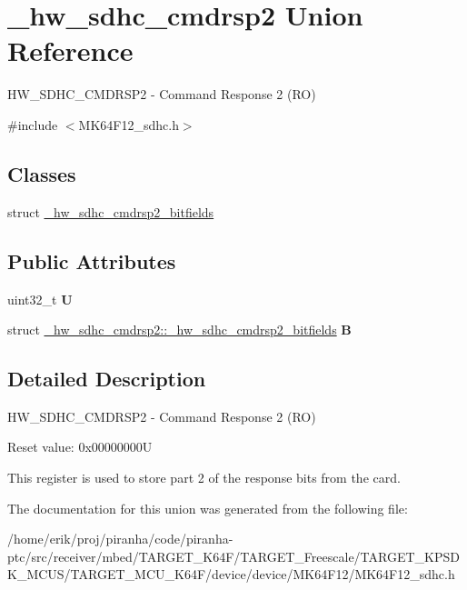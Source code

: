 \hypertarget{union__hw__sdhc__cmdrsp2}{}\section{\+\_\+hw\+\_\+sdhc\+\_\+cmdrsp2 Union Reference}
\label{union__hw__sdhc__cmdrsp2}


H\+W\+\_\+\+S\+D\+H\+C\+\_\+\+C\+M\+D\+R\+S\+P2 -\/ Command Response 2 (RO)  




{\ttfamily \#include $<$M\+K64\+F12\+\_\+sdhc.\+h$>$}

\subsection*{Classes}
\begin{DoxyCompactItemize}
\item 
struct \hyperlink{struct__hw__sdhc__cmdrsp2_1_1__hw__sdhc__cmdrsp2__bitfields}{\+\_\+hw\+\_\+sdhc\+\_\+cmdrsp2\+\_\+bitfields}
\end{DoxyCompactItemize}
\subsection*{Public Attributes}
\begin{DoxyCompactItemize}
\item 
uint32\+\_\+t {\bfseries U}\hypertarget{union__hw__sdhc__cmdrsp2_ac24473eb1e2d8612eb11709e5490f5c2}{}\label{union__hw__sdhc__cmdrsp2_ac24473eb1e2d8612eb11709e5490f5c2}

\item 
struct \hyperlink{struct__hw__sdhc__cmdrsp2_1_1__hw__sdhc__cmdrsp2__bitfields}{\+\_\+hw\+\_\+sdhc\+\_\+cmdrsp2\+::\+\_\+hw\+\_\+sdhc\+\_\+cmdrsp2\+\_\+bitfields} {\bfseries B}\hypertarget{union__hw__sdhc__cmdrsp2_a3764c85a7aaaeead2ca2b94db4eca784}{}\label{union__hw__sdhc__cmdrsp2_a3764c85a7aaaeead2ca2b94db4eca784}

\end{DoxyCompactItemize}


\subsection{Detailed Description}
H\+W\+\_\+\+S\+D\+H\+C\+\_\+\+C\+M\+D\+R\+S\+P2 -\/ Command Response 2 (RO) 

Reset value\+: 0x00000000U

This register is used to store part 2 of the response bits from the card. 

The documentation for this union was generated from the following file\+:\begin{DoxyCompactItemize}
\item 
/home/erik/proj/piranha/code/piranha-\/ptc/src/receiver/mbed/\+T\+A\+R\+G\+E\+T\+\_\+\+K64\+F/\+T\+A\+R\+G\+E\+T\+\_\+\+Freescale/\+T\+A\+R\+G\+E\+T\+\_\+\+K\+P\+S\+D\+K\+\_\+\+M\+C\+U\+S/\+T\+A\+R\+G\+E\+T\+\_\+\+M\+C\+U\+\_\+\+K64\+F/device/device/\+M\+K64\+F12/M\+K64\+F12\+\_\+sdhc.\+h\end{DoxyCompactItemize}
